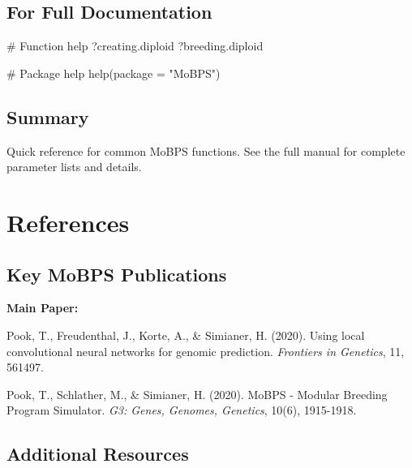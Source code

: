 \documentclass[
  letterpaper,
]{book}
\newenvironment{Shaded}{\begin{snugshade}}{\end{snugshade}}
\newcommand{\AttributeTok}[1]{\textcolor[rgb]{0.40,0.45,0.13}{#1}}
\newcommand{\CommentTok}[1]{\textcolor[rgb]{0.37,0.37,0.37}{#1}}
\newcommand{\FunctionTok}[1]{\textcolor[rgb]{0.28,0.35,0.67}{#1}}
\newcommand{\NormalTok}[1]{\textcolor[rgb]{0.00,0.23,0.31}{#1}}
\newcommand{\StringTok}[1]{\textcolor[rgb]{0.13,0.47,0.30}{#1}}
\begin{document}
\section{For Full Documentation}\label{for-full-documentation}

\begin{Shaded}
\begin{Highlighting}[]
\CommentTok{\# Function help}
\NormalTok{?creating.diploid}
\NormalTok{?breeding.diploid}

\CommentTok{\# Package help}
\FunctionTok{help}\NormalTok{(}\AttributeTok{package =} \StringTok{"MoBPS"}\NormalTok{)}
\end{Highlighting}
\end{Shaded}

\section{Summary}\label{summary-16}

Quick reference for common MoBPS functions. See the full manual for
complete parameter lists and details.


\chapter*{References}\label{references}


\section*{Key MoBPS Publications}\label{key-mobps-publications}


\textbf{Main Paper:}

Pook, T., Freudenthal, J., Korte, A., \& Simianer, H. (2020). Using
local convolutional neural networks for genomic prediction.
\emph{Frontiers in Genetics}, 11, 561497.

Pook, T., Schlather, M., \& Simianer, H. (2020). MoBPS - Modular
Breeding Program Simulator. \emph{G3: Genes, Genomes, Genetics}, 10(6),
1915-1918.

\section*{Additional Resources}\label{additional-resources}
\end{document}
